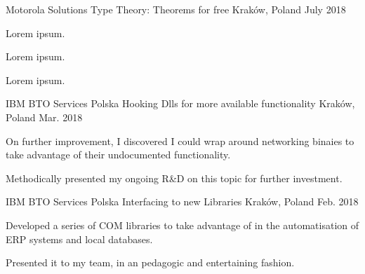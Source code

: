 
\begin{cventries}

\cventry
    {Motorola Solutions} %
    {Type Theory: Theorems for free} %
    {Kraków, Poland} %
    {July 2018} %
    {
        \begin{cvitems} %
            \item {Lorem ipsum.}
            \item {Lorem ipsum.}
            \item {Lorem ipsum.}
        \end{cvitems}
    }

  \cventry
    {IBM BTO Services Polska} %
    {Hooking Dlls for more available functionality} %
    {Kraków, Poland} %
    {Mar. 2018} %
    {
        \begin{cvitems} %
            \item {On further improvement, I discovered I could wrap around networking binaies to take advantage of their undocumented functionality.}
            \item {Methodically presented my ongoing R\&D on this topic for further investment.}
        \end{cvitems}
    }

  \cventry
    {IBM BTO Services Polska} %
    {Interfacing to new Libraries} %
    {Kraków, Poland} %
    {Feb. 2018} %
    {
        \begin{cvitems} %
            \item {Developed a series of COM libraries to take advantage of in the automatisation of ERP systems and local databases.}
            \item {Presented it to my team, in an pedagogic and entertaining fashion.}
        \end{cvitems}
    }


\end{cventries}
